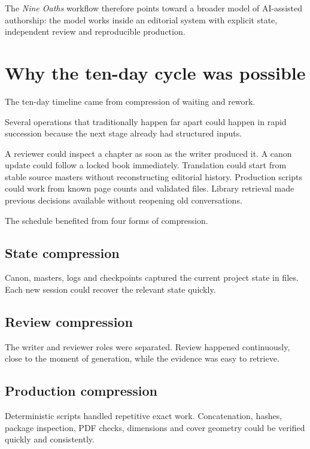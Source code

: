 \documentclass[11pt,oneside,openany]{book}
\begin{document}
The \emph{Nine Oaths} workflow therefore points toward a broader model of AI-assisted authorship: the model works inside an editorial system with explicit state, independent review and reproducible production.

\chapter{Why the ten-day cycle was possible}\label{why-the-ten-day-cycle-was-possible}

The ten-day timeline came from compression of waiting and rework.

Several operations that traditionally happen far apart could happen in rapid succession because the next stage already had structured inputs.

A reviewer could inspect a chapter as soon as the writer produced it. A canon update could follow a locked book immediately. Translation could start from stable source masters without reconstructing editorial history. Production scripts could work from known page counts and validated files. Library retrieval made previous decisions available without reopening old conversations.

The schedule benefited from four forms of compression.

\section{State compression}\label{state-compression}

Canon, masters, logs and checkpoints captured the current project state in files. Each new session could recover the relevant state quickly.

\section{Review compression}\label{review-compression}

The writer and reviewer roles were separated. Review happened continuously, close to the moment of generation, while the evidence was easy to retrieve.

\section{Production compression}\label{production-compression}

Deterministic scripts handled repetitive exact work. Concatenation, hashes, package inspection, PDF checks, dimensions and cover geometry could be verified quickly and consistently.
\end{document}

